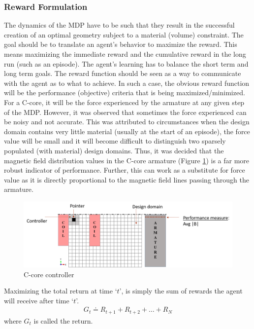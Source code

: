 \subsubsection{Reward Formulation}
The dynamics of the MDP have to be such that they result in the successful creation of an optimal geometry subject to a material (volume) constraint. The goal should be to translate an agent's behavior to maximize the reward. This means maximizing the immediate reward and the cumulative reward in the long run (such as an episode). The agent's learning has to balance the short term and long term goals. The reward function should be seen as a way to communicate with the agent as to what to achieve. 
In such a case, the obvious reward function will be the performance (objective) criteria that is being maximized/minimized. For a C-core, it will be the force experienced by the armature at any given step of the MDP. 
However, it was observed that sometimes the force experienced can be noisy and not accurate. This was attributed to circumstances when the design domain contains very little material (usually at the start of an episode), the force value will be small and it will become difficult to distinguish two sparsely populated (with material) design domains. Thus, it was decided that the magnetic field distribution values in the C-core armature (Figure \ref{fig:MDP_c_core_controller2}) is a far more robust indicator of performance. Further, this can work as a substitute for force value as it is directly proportional to the magnetic field lines passing through the armature. 

\begin{figure}[h!]
    \centering
    \includegraphics[width=\textwidth]{Figures/Ch_MDP/C_core_controller.png}
    \caption{C-core controller}
    \label{fig:MDP_c_core_controller2}
\end{figure}
Maximizing the total return at time `$t$', is simply the sum of rewards the agent will receive after time `$t$'.
\begin{align*}
    G_t \doteq R_{t+1} + R_{t+2} + \hdots + R_{N}
\end{align*}
where $G_t$ is called the return.

